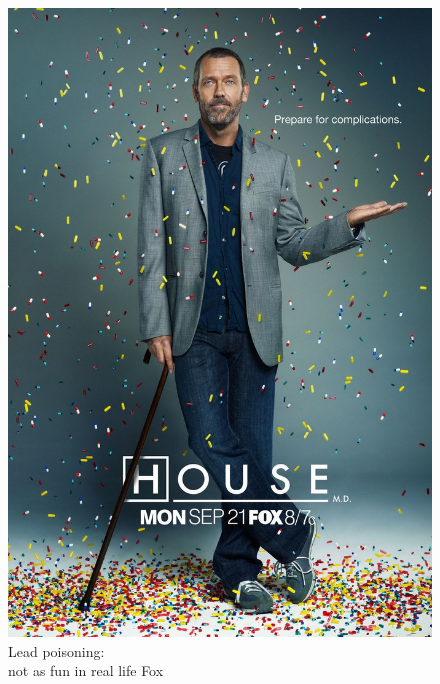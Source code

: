 \documentclass{beamer}
\begin{document}
\begin{frame}
\begin{columns}[t]
\begin{figure}
\centering
\includegraphics[width=0.8\columnwidth]{images-dis1/house}
\newline
Lead poisoning: \\
not as fun in real life
{\tiny \textcopyright Fox}
\end{figure}
\end{columns}
\end{frame}
\end{document}
